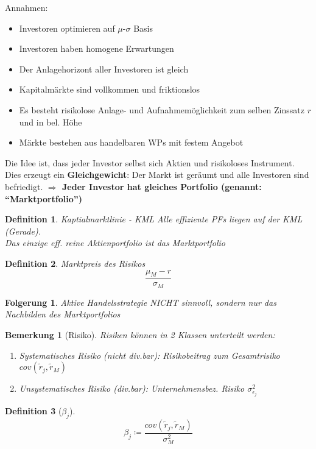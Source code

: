 \documentclass[a4paper]{article}
\theoremstyle{break}
\newtheorem{defi}{Definition}[section]
\newtheorem{ann}{Bemerkung}[section]
\newtheorem{der}{Folgerung}[section]
\begin{document}
Annahmen:
\begin{itemize}
    \item Investoren optimieren auf $\mu$-$\sigma$ Basis
    \item Investoren haben homogene Erwartungen
    \item Der Anlagehorizont aller Investoren ist gleich
    \item Kapitalmärkte sind vollkommen und friktionslos
    \item Es besteht risikolose Anlage- und Aufnahmemöglichkeit zum selben Zinssatz $r$ und in bel. Höhe
    \item Märkte bestehen aus handelbaren WPs mit festem Angebot
\end{itemize}

Die Idee ist, dass jeder Investor selbst sich Aktien und risikoloses Instrument. Dies erzeugt ein \textbf{Gleichgewicht}: Der Markt ist geräumt und alle Investoren sind befriedigt. \textbf{$\Longrightarrow$ Jeder Investor hat gleiches Portfolio (genannt: ``Marktportfolio'')}

\begin{defi}{Kaptialmarktlinie - KML}
    Alle effiziente PFs liegen auf der KML (Gerade).\\
    Das einzige eff. reine Aktienportfolio ist das Marktportfolio
\end{defi}

\begin{defi}{Marktpreis des Risikos}
    $$\frac{\mu_M - r}{\sigma_M}$$
\end{defi}

\begin{der}
    Aktive Handelsstrategie NICHT sinnvoll, sondern nur das Nachbilden des Marktportfolios    
\end{der}

\begin{ann}[Risiko]
    Risiken können in 2 Klassen unterteilt werden:\\
   \begin{enumerate}
       \item Systematisches Risiko (nicht div.bar): Risikobeitrag zum Gesamtrisiko $cov(\tilde{r}_j, \tilde{r}_M)$
       \item Unsystematisches Risiko (div.bar): Unternehmensbez. Risiko $\sigma^{2}_{\epsilon_j}$
   \end{enumerate}    
\end{ann}

\begin{defi}[$\beta_j$]
    $$\beta_j \coloneqq \frac{cov(\tilde{r}_j, \tilde{r}_M)}{\sigma^{2}_M}$$
\end{defi}

\end{document}
